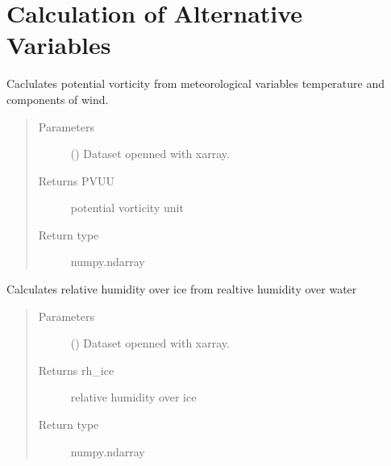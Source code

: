 \documentclass[a4paper,11pt,english]{sphinxmanual}
\begin{document}
\section{Calculation of Alternative Variables}
\label{\detokenize{modules:module-envlib.calc_altrv_vars}}\label{\detokenize{modules:calculation-of-alternative-variables}}

\begin{fulllineitems}
\label{\detokenize{modules:envlib.calc_altrv_vars.get_pvu}}
Caclulates potential vorticity from meteorological variables temperature and components of wind.
\begin{quote}\begin{description}
\item[{Parameters}] \leavevmode
{} () \textendash{} Dataset openned with xarray.

\item[{Returns PVUU}] \leavevmode
potential vorticity unit

\item[{Return type}] \leavevmode
numpy.ndarray

\end{description}\end{quote}

\end{fulllineitems}


\begin{fulllineitems}
\label{\detokenize{modules:envlib.calc_altrv_vars.get_rh_ice}}
Calculates relative humidity over ice from realtive humidity over water
\begin{quote}\begin{description}
\item[{Parameters}] \leavevmode
{} () \textendash{} Dataset openned with xarray.

\item[{Returns rh\_ice}] \leavevmode
relative humidity over ice

\item[{Return type}] \leavevmode
numpy.ndarray

\end{description}\end{quote}

\end{fulllineitems}
\end{document}
